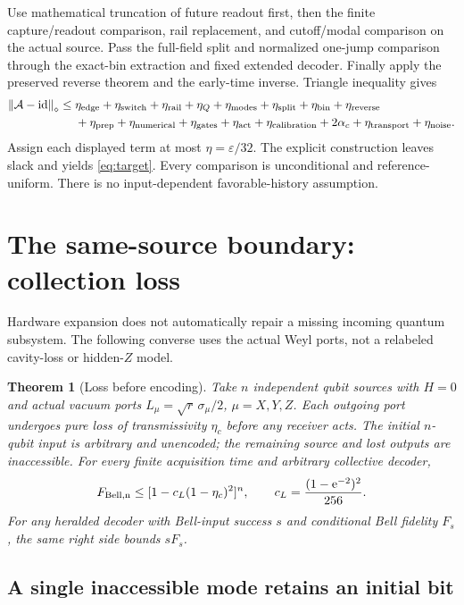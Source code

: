 \documentclass[11pt,a4paper]{article}
\newtheorem{theorem}{Theorem}\newtheorem{lemma}[theorem]{Lemma}\newtheorem{corollary}[theorem]{Corollary}
\newcommand{\id}{\operatorname{id}}\newcommand{\Tr}{\operatorname{Tr}}\newcommand{\osc}{\operatorname{osc}}
\newcommand{\norm}[1]{\left\lVert #1\right\rVert}\newcommand{\ket}[1]{\lvert #1\rangle}\newcommand{\bra}[1]{\langle #1\rvert}
\newcommand{\cA}{\mathcal A}\newcommand{\cC}{\mathcal C}\newcommand{\cD}{\mathcal D}\newcommand{\cR}{\mathcal R}
\newcommand{\ee}{\mathrm e}
\begin{document}
Use mathematical truncation of future readout first, then the finite capture/readout comparison, rail replacement, and cutoff/modal comparison on the actual source. Pass the full-field split and normalized one-jump comparison through the exact-bin extraction and fixed extended decoder. Finally apply the preserved reverse theorem and the early-time inverse. Triangle inequality gives
\begin{align}
 \norm{\cA-\id}_\diamond\le{}&
 \eta_{\rm edge}+\eta_{\rm switch}+\eta_{\rm rail}+\eta_Q+\eta_{\rm modes}
 +\eta_{\rm split}+\eta_{\rm bin}+\eta_{\rm reverse}\nonumber\\
 &+\eta_{\rm prep}+\eta_{\rm numerical}+\eta_{\rm gates}+\eta_{\rm act}
 +\eta_{\rm calibration}+2\alpha_c+\eta_{\rm transport}+\eta_{\rm noise}.
 \label{eq:total}
\end{align}
Assign each displayed term at most $\eta=\varepsilon/32$. The explicit construction leaves slack and yields \eqref{eq:target}. Every comparison is unconditional and reference-uniform. There is no input-dependent favorable-history assumption.

\section{The same-source boundary: collection loss}
\label{sec:loss}

Hardware expansion does not automatically repair a missing incoming quantum subsystem. The following converse uses the actual Weyl ports, not a relabeled cavity-loss or hidden-$Z$ model.

\begin{theorem}[Loss before encoding]
\label{thm:loss}
Take $n$ independent qubit sources with $H=0$ and actual vacuum ports $L_\mu=\sqrt r\,\sigma_\mu/2$, $\mu=X,Y,Z$. Each outgoing port undergoes pure loss of transmissivity $\eta_c$ before any receiver acts. The initial $n$-qubit input is arbitrary and unencoded; the remaining source and lost outputs are inaccessible. For every finite acquisition time and arbitrary collective decoder,
\begin{equation}
 F_{\rm Bell,n}\le[1-c_L(1-\eta_c)^2]^n,\qquad
 c_L=\frac{(1-\ee^{-2})^2}{256}.
 \label{eq:lossmain}
\end{equation}
For any heralded decoder with Bell-input success $s$ and conditional Bell fidelity $F_s$, the same right side bounds $sF_s$.
\end{theorem}

\subsection{A single inaccessible mode retains an initial bit}
\end{document}
